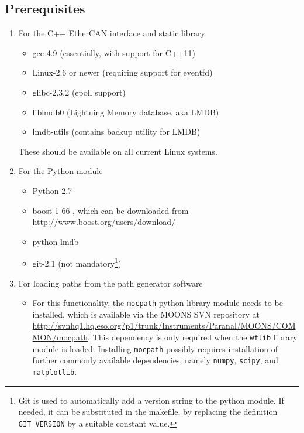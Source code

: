 \documentclass[11pt,a4paper]{report}
\begin{document}
\subsection{Prerequisites}

\begin{enumerate}
  \item For the C++ EtherCAN interface and static library

    
\begin{itemize}
\item gcc-4.9 (essentially, with support for C++11)
\item Linux-2.6 or newer (requiring support for eventfd)
\item glibc-2.3.2 (epoll support)
\item liblmdb0 (Lightning Memory database, aka LMDB)
\item lmdb-utils (contains backup utility for LMDB)
\end{itemize}

These should be available on all current Linux systems.

\item For the Python module

\begin{itemize}
\item Python-2.7
\item boost-1-66 , which can be downloaded from \url{http://www.boost.org/users/download/}
\item python-lmdb
\item git-2.1 (not mandatory\footnote{Git is used to automatically add a version
  string to the python module. If needed, it can be substituted in the
  makefile, by replacing the definition \texttt{GIT\_VERSION} by a
  suitable constant value.})
\end{itemize}


\item For loading paths from the path generator software
\begin{itemize}
\item For this functionality, the \texttt{mocpath} python library
  module needs to be installed, which is available via the MOONS SVN
  repository at
  \url{http://svnhq1.hq.eso.org/p1/trunk/Instruments/Paranal/MOONS/COMMON/mocpath}.
  This dependency is only required when the \texttt{wflib} library
  module is loaded. Installing \texttt{mocpath} possibly requires
  installation of further commonly available dependencies, namely
  \texttt{numpy}, \texttt{scipy}, and \texttt{matplotlib}.
\end{itemize}
\end{enumerate}
\end{document}
